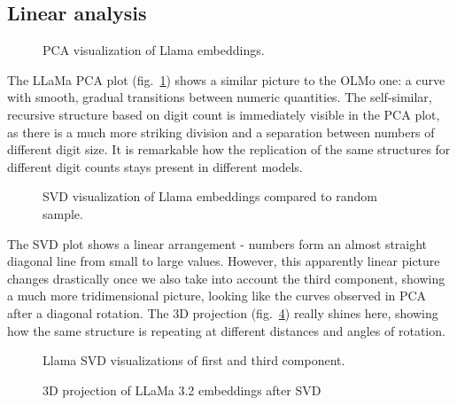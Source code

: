 \documentclass[
  a4paper, twoside, 10pt, titlepage]{book}
\makeatletter
\newcommand*\pandocbounded[1]{%
  \sbox\pandoc@box{#1}%
  \Gscale@div\@tempa{\textheight}{\dimexpr\ht\pandoc@box+\dp\pandoc@box\relax}%
  \Gscale@div\@tempb{\linewidth}{\wd\pandoc@box}%
  \ifdim\@tempb\p@<\@tempa\p@\let\@tempa\@tempb\fi%
  \ifdim\@tempa\p@<\p@\scalebox{\@tempa}{\usebox\pandoc@box}%
  \else\usebox{\pandoc@box}%
  \fi%
}
\makeatother
\begin{document}
\subsection{Linear analysis}\label{linear-analysis-1}

\begin{figure}
\centering
\pandocbounded{}
\caption{PCA visualization of Llama embeddings.}\label{fig:llama-pca}
\end{figure}

The LLaMa PCA plot (fig.~\ref{fig:llama-pca}) shows a similar picture to
the OLMo one: a curve with smooth, gradual transitions between numeric
quantities. The self-similar, recursive structure based on digit count
is immediately visible in the PCA plot, as there is a much more striking
division and a separation between numbers of different digit size. It is
remarkable how the replication of the same structures for different
digit counts stays present in different models.

\begin{figure}
\centering
\pandocbounded{}
\caption{SVD visualization of Llama embeddings compared to random
sample.}\label{fig:llama-svd}
\end{figure}

The SVD plot shows a linear arrangement - numbers form an almost
straight diagonal line from small to large values. However, this
apparently linear picture changes drastically once we also take into
account the third component, showing a much more tridimensional picture,
looking like the curves observed in PCA after a diagonal rotation. The
3D projection (fig.~\ref{fig:llama-svd-3d}) really shines here, showing
how the same structure is repeating at different distances and angles of
rotation.

\begin{figure}
\centering
\pandocbounded{}
\caption{Llama SVD visualizations of first and third
component.}\label{fig:llama-svd-digits}
\end{figure}

\begin{figure}
\centering
\pandocbounded{\texttt{[image: plots/llama\_svd\_3d.png]}}
\caption{3D projection of LLaMa 3.2 embeddings after
SVD}\label{fig:llama-svd-3d}
\end{figure}
\end{document}
